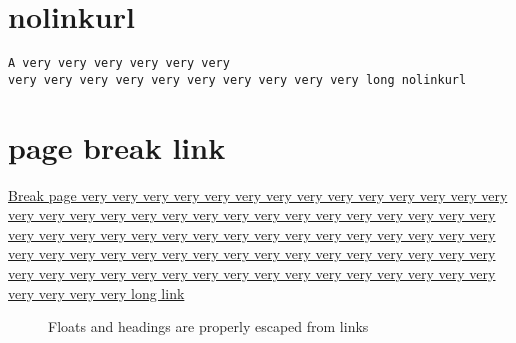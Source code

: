 \documentclass{article}
\begin{document}
\section{nolinkurl}
\nolinkurl{A very very very very very very 
very very very very very very very very very very long nolinkurl}

\section{page break link}

\href{www.pagebreak.lt}{Break page very very very very very very 
very very very very very very very very very very 
very very very very very very very very very very very very 
very very very very very very very very very very 
very very very very very very very very very very very very 
very very very very very very very very very very 
very very very very very very very very very very very very 
very very very very very very very very very very long link
} 

\begin{figure}
\caption{Floats and headings are properly escaped from links} 
\end{figure}
\end{document}
